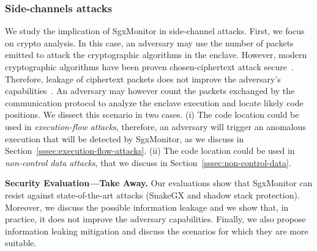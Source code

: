 \subsubsection{Side-channels attacks}
\label{sssec:info-leakage}

We study the implication of SgxMonitor in side-channel attacks.
First, we focus on crypto analysis. In this case, an adversary may use the 
number of packets emitted to attack the cryptographic algorithms in the 
enclave. However, 
modern cryptographic algorithms have been proven chosen-ciphertext attack 
secure~\citep{barthe2011beyond}. Therefore, leakage of ciphertext packets does 
not improve the adversary's capabilities~\citep{wee2010efficient}. 
%
An adversary may however count the packets exchanged by the communication 
protocol to analyze the enclave execution and locate likely code
positions. 
We dissect this scenario in two cases.
(i) The code location could be used in \emph{execution-flow attacks}, 
therefore, an adversary will trigger an anomalous execution that will be 
detected by SgxMonitor, as we discuss in 
Section~\ref{sssec:execution-flow-attacks}.
(ii) The code location could be used in \emph{non-control data attacks}, that 
we discuss in Section~\ref{sssec:non-control-data}.

\vspace{0.5cm}
\noindent \textbf{Security Evaluation---Take Away.}
Our evaluations show that SgxMonitor can resist against state-of-the-art 
attacks (\ie \textsf{SnakeGX} and shadow stack protection).
Moreover, we discuss the possible information leakage and we show that, in 
practice, it does not improve the adversary capabilities.
Finally, we also propose information leaking mitigation and discuss the 
scenarios for which they are more suitable.